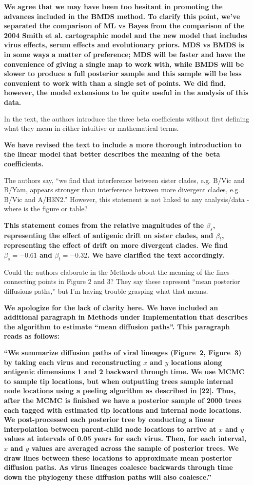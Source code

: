 \documentclass[11pt,oneside,letterpaper]{article}
\begin{document}
\textbf{We agree that we may have been too hesitant in promoting the advances included in the BMDS method.  To clarify this point, we've separated the comparison of ML vs Bayes from the comparison of the 2004 Smith et al. cartographic model and the new model that includes virus effects, serum effects and evolutionary priors.  MDS vs BMDS is in some ways a matter of preference; MDS will be faster and have the convenience of giving a single map to work with, while BMDS will be slower to produce a full posterior sample and this sample will be less convenient to work with than a single set of points.  We did find, however, the model extensions to be quite useful in the analysis of this data.}

In the text, the authors introduce the three beta coefficients without first defining what they mean in either intuitive or mathematical terms.

\textbf{We have revised the text to include a more thorough introduction to the linear model that better describes the meaning of the beta coefficients.}

The authors say, ``we find that interference between sister clades, e.g. B/Vic and B/Yam, appears stronger than interference between more divergent clades, e.g. B/Vic and A/H3N2.'' However, this statement is not linked to any analysis/data - where is the figure or table?

\textbf{This statement comes from the relative magnitudes of the $\beta_s$, representing the effect of antigenic drift on sister clades, and $\beta_t$, representing the effect of drift on more divergent clades.  We find $\beta_s = -0.61$ and $\beta_t = -0.32$.  We have clarified the text accordingly.}

Could the authors elaborate in the Methods about the meaning of the lines connecting points in Figure 2 and 3? They say these represent ``mean posterior diffusions paths,'' but I'm having trouble grasping what that means.

\textbf{We apologize for the lack of clarity here.  We have included an additional paragraph in Methods under Implementation that describes the algorithm to estimate ``mean diffusion paths''.  This paragraph reads as follows:}

\textbf{``We summarize diffusion paths of viral lineages (Figure~2, Figure~3) by taking each virus and reconstructing $x$ and $y$ locations along antigenic dimensions 1 and 2 backward through time.
We use MCMC to sample tip locations, but when outputting trees sample internal node locations using a peeling algorithm as described in [22].
Thus, after the MCMC is finished we have a posterior sample of 2000 trees each tagged with estimated tip locations and internal node locations.
We post-processed each posterior tree by conducting a linear interpolation between parent-child node locations to arrive at $x$ and $y$ values at intervals of 0.05 years for each virus.
Then, for each interval, $x$ and $y$ values are averaged across the sample of posterior trees.
We draw lines between these locations to approximate mean posterior diffusion paths.
As virus lineages coalesce backwards through time down the phylogeny these diffusion paths will also coalesce.''}
\end{document}
